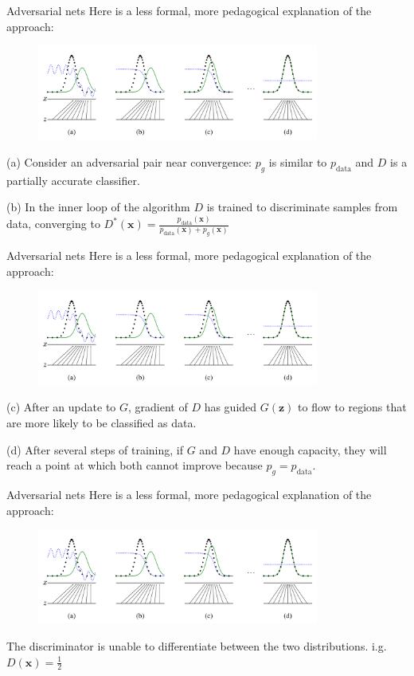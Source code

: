 \documentclass[10pt]{beamer}
\begin{document}
	\begin{frame}[t]{Adversarial nets}
		Here is a less formal, more pedagogical explanation of the approach:
		\begin{figure}
			\includegraphics[width=25em]{figures/GAN-pedagogical-explanation.png}
		\end{figure}
		(a) Consider an adversarial pair near convergence: $p_g$ is similar to $p_{\text{data}}$ and $D$ is a partially accurate classifier.
		
		\pause
		(b) In the inner loop of the algorithm $D$ is trained to discriminate samples from data, converging to $D^*(\bm{x})=\frac{p_{\text{data}}(\bm{x})}{p_{\text{data}}(\bm{x})+p_g(\bm{x})}$
	\end{frame}

	\begin{frame}[t]{Adversarial nets}
		Here is a less formal, more pedagogical explanation of the approach:
		\begin{figure}
			\includegraphics[width=25em]{figures/GAN-pedagogical-explanation.png}
		\end{figure}
		(c) After an update to $G$, gradient of $D$ has guided $G(\bm{z})$ to flow to regions that are more likely to be classified as data.
		
		\pause
		(d) After several steps of training, if $G$ and $D$ have enough capacity, they will reach a point at which both cannot improve because $p_g=p_{\text{data}}$.
	\end{frame}

	\begin{frame}[t]{Adversarial nets}
		Here is a less formal, more pedagogical explanation of the approach:
		\begin{figure}
			\includegraphics[width=25em]{figures/GAN-pedagogical-explanation.png}
		\end{figure}
		The discriminator is unable to differentiate between the two distributions. i.g. $D(\bm{x})=\frac{1}{2}$
	\end{frame}
\end{document}

